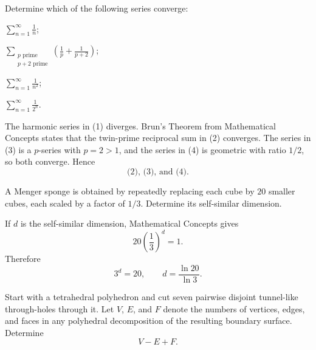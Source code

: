     \begin{expectedproblem}
        Determine which of the following series converge:
        \begin{problemchoices}
            \item $\displaystyle\sum_{n=1}^{\infty}\frac1n$;
            \item $\displaystyle
                  \sum_{\substack{p\text{ prime}\\p+2\text{ prime}}}
                  \left(\frac1p+\frac1{p+2}\right)$;
            \item $\displaystyle\sum_{n=1}^{\infty}\frac1{n^2}$;
            \item $\displaystyle\sum_{n=1}^{\infty}\frac1{2^n}$.
        \end{problemchoices}
    \end{expectedproblem}

    \begin{solution}
        The harmonic series in (1) diverges. Brun's Theorem from Mathematical
        Concepts states that the twin-prime reciprocal sum in (2) converges.
        The series in (3) is a $p$-series with $p=2>1$, and the series in (4)
        is geometric with ratio $1/2$, so both converge. Hence
        \[
            \boxed{\text{(2), (3), and (4)}}.
        \]
    \end{solution}

    \begin{expectedproblem}
        A Menger sponge is obtained by repeatedly replacing each cube by $20$
        smaller cubes, each scaled by a factor of $1/3$. Determine its
        self-similar dimension.
    \end{expectedproblem}

    \begin{solution}
        If $d$ is the self-similar dimension, Mathematical Concepts gives
        \[
            20\left(\frac13\right)^d=1.
        \]
        Therefore
        \[
            3^d=20,
            \qquad
            \boxed{d=\frac{\ln20}{\ln3}}.
        \]
    \end{solution}

    \begin{expectedproblem}
        Start with a tetrahedral polyhedron and cut seven pairwise disjoint
        tunnel-like through-holes through it. Let $V$, $E$, and $F$ denote the
        numbers of vertices, edges, and faces in any polyhedral decomposition
        of the resulting boundary surface. Determine
        \[
            V-E+F.
        \]
    \end{expectedproblem}

